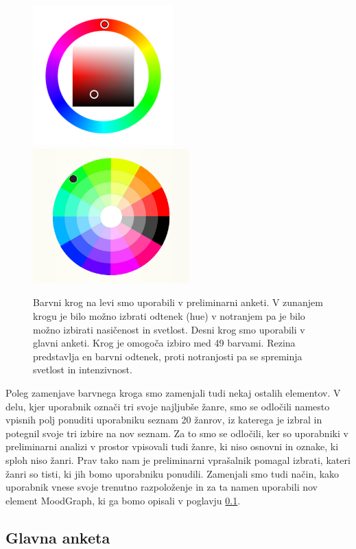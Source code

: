 \documentclass[a4paper, 12pt]{book}
\begin{document}
{\begin{figure}[hbt]
\centering
\includegraphics[width=54mm]{colorwheelold.png}
\includegraphics[width=60mm]{colorwheel.png}

\caption{Barvni krog na levi smo uporabili v preliminarni anketi. V zunanjem krogu je bilo možno izbrati odtenek (hue) v notranjem pa je bilo možno izbirati nasičenost in svetlost. Desni krog smo uporabili v glavni anketi. Krog je omogoča izbiro med 49 barvami. Rezina predstavlja en barvni odtenek, proti notranjosti pa se spreminja svetlost in intenzivnost. }
\label{colorwheels}
\end{figure}

Poleg zamenjave barvnega kroga smo zamenjali tudi nekaj ostalih elementov. V delu, kjer uporabnik označi tri svoje najljubše žanre, smo se odločili namesto vpisnih polj ponuditi uporabniku seznam 20 žanrov, iz katerega je izbral in potegnil svoje tri izbire na nov seznam.  Za to smo se odločili, ker so uporabniki v preliminarni analizi v prostor vpisovali tudi žanre, ki niso osnovni in oznake, ki sploh niso žanri. Prav tako nam je preliminarni vprašalnik pomagal izbrati, kateri žanri so tisti, ki jih bomo uporabniku ponudili. Zamenjali smo tudi način, kako uporabnik vnese svoje trenutno razpoloženje in za ta namen uporabili nov element MoodGraph, ki ga bomo opisali v poglavju \ref{glavnaanketa}. 



\subsection{Glavna anketa}
\label{glavnaanketa}

}
\end{document}
